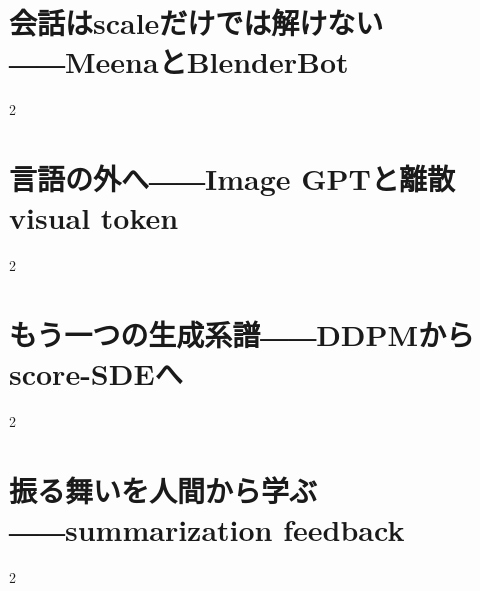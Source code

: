 \documentclass[lualatex,a4paper,11pt]{jlreq}
\begin{document}
\Needspace{0.45\textheight}
\bigskip
\section{会話はscaleだけでは解けない――MeenaとBlenderBot}
\label{pkg:dialogue-systems}
\vspace{0.15em}

\vspace{0.20em}
\begin{multicols}{2}

\end{multicols}

\medskip


\Needspace{0.45\textheight}
\bigskip
\section{言語の外へ――Image GPTと離散visual token}
\label{pkg:media-autoregressive}
\vspace{0.15em}

\vspace{0.20em}
\begin{multicols}{2}

\end{multicols}

\medskip


\Needspace{0.45\textheight}
\bigskip
\section{もう一つの生成系譜――DDPMからscore-SDEへ}
\label{pkg:diffusion-score}
\vspace{0.15em}

\vspace{0.20em}
\begin{multicols}{2}

\end{multicols}

\medskip


\Needspace{0.45\textheight}
\bigskip
\section{振る舞いを人間から学ぶ――summarization feedback}
\label{pkg:feedback-steering}
\vspace{0.15em}

\vspace{0.20em}
\begin{multicols}{2}

\end{multicols}

\medskip

\end{document}

